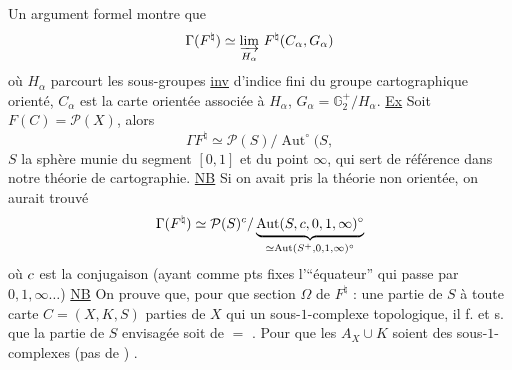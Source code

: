 Un argument  formel montre que
\[
\Gamma(F^\natural)\simeq\underset{H_\alpha}{\varinjlim}\ F^\natural(C_\alpha,G_\alpha)
\]
où $H_\alpha$ parcourt les sous-groupes \uline{inv} d’indice fini du groupe cartographique orienté, $C_\alpha$ est la carte orientée associée à $H_\alpha$, $G_\alpha=\mathbb G_2^+/H_\alpha$.
\uline{Ex} Soit $F(C)=\mathcal P(X)$, alors
\[
\Gamma F^\natural\simeq\mathcal P(S)/\operatorname{Aut}^\circ(S,
\]
$S$  la sphère munie du segment $[0,1]$ et du point $\infty$,
 qui sert de référence dans notre théorie de cartographie.
\uline{NB} Si on avait pris la théorie non orientée, on aurait trouvé
\[
\Gamma(F^\natural)\simeq\mathcal P(S)^{c}/
\underbrace{\operatorname{Aut}(S,c,0,1,\infty)^\circ}_{\simeq\operatorname{Aut}(S^+,0,1,\infty)^\circ}
\]
où $c$ est la conjugaison (ayant comme pts fixes l’``équateur'' qui passe par $0,1,\infty\ldots$)
\uline{NB} On prouve  que, pour que  section $\Omega$ de $F^\natural$ : une partie  de $S$   à toute carte $C=(X,K,S)$  parties  de $X$ qui  un sous-$1$-complexe topologique, il f. et s. que la partie de $S$ envisagée soit de $=$ .
Pour que les $A_X\cup K$ soient des sous-$1$-complexes (pas de ) \unsure{cf] et 1|si] et 1}.
